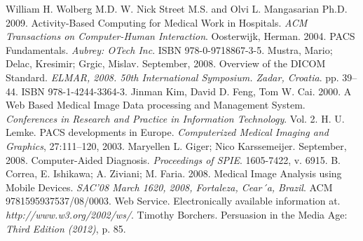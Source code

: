 \begin{thebibliography}{}
\bibitem{} William H. Wolberg M.D. W. Nick Street M.S. and Olvi L. Mangasarian Ph.D. 2009. Activity-Based Computing for Medical Work in Hospitals. \emph{ACM Transactions on Computer-Human Interaction}.
\bibitem{} Oosterwijk, Herman. 2004. PACS Fundamentals. \emph{Aubrey: OTech Inc}. ISBN 978-0-9718867-3-5.
\bibitem{} Mustra, Mario; Delac, Kresimir; Grgic, Mislav. September, 2008. Overview of the DICOM Standard. \emph{ELMAR, 2008. 50th International Symposium. Zadar, Croatia}. pp. 39–44. ISBN 978-1-4244-3364-3.
\bibitem{} Jinman Kim, David D. Feng, Tom W. Cai. 2000. A Web Based Medical Image Data processing and Management System. \emph{Conferences
in Research and Practice in Information Technology}. Vol. 2.
\bibitem{} H. U. Lemke. PACS developments in Europe. \emph{Computerized Medical Imaging and Graphics}, 27:111–120, 2003.
\bibitem{} Maryellen L. Giger; Nico Karssemeijer. September, 2008. Computer-Aided Diagnosis. \emph{Proceedings of SPIE}. 1605-7422, v. 6915.
\bibitem{} B. Correa, E. Ishikawa; A. Ziviani; M. Faria. 2008. Medical Image Analysis using Mobile Devices. \emph{SAC’08 March 1620, 2008, Fortaleza, Cear´a, Brazil}. ACM 9781595937537/08/0003.
\bibitem{} Web Service. Electronically available information at. \emph{http://www.w3.org/2002/ws/}.
\bibitem{} Timothy Borchers. Persuasion in the Media Age: \emph{Third Edition (2012)}, p. 85.
\end{thebibliography}


